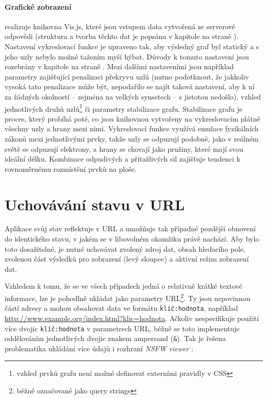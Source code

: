 \documentclass[a4paper, 11pt, oneside]{book}
\newcommand{\simplywn}{\textit{NSFW viewer} }
\newcommand{\itNameRef}[1]{\textit{\nameref{#1}}}
\begin{document}
				\paragraph{Grafické zobrazení} realizuje knihovna Vis.js, které jsou vstupem data vytvořená ze serverové odpovědi (struktura a tvorba těchto dat je popsána v kapitole \itNameRef{cha:zpracovani} na straně \pageref{cha:zpracovani}). Nastavení vykreslovací funkce je upraveno tak, aby výsledný graf byl statický a s jeho uzly nebylo možné tažením myší hýbat. Důvody k tomuto nastavení jsou rozebrány v kapitole \itNameRef{cha:navrh} na straně \pageref{cha:shrnuti-prehledu}. Mezi dalšími nastaveními jsou například parametry zajišťující penalizaci překryvu uzlů (nutno podotknout, že jakkoliv vysoká tato penalizace může být, nepodařilo se najít taková nastavení, aby k ní za žádných okolností -- zejména na velkých synsetech -- s jistotou nedošlo), vzhled jednotlivých druhů uzlů\footnote{vzhled prvků grafu není možné definovat externími pravidly v CSS} či parametry stabilizace grafu. Stabilizace grafu je proces, který probíhá poté, co jsou knihovnou vytvořeny na vykreslovacím plátně všechny uzly a hrany mezi nimi. Vykreslovací funkce využívá emulace fyzikálních zákonů mezi jednotlivými prvky, takže uzly se odpuzují podobně, jako v reálném světě se odpuzují elektrony, a hrany se chovají jako pružiny, které mají svou ideální délku. Kombinace odpudivých a přitažlivých sil zajišťuje tendenci k rovnoměrnému rozmístění prvků na ploše.

			\section{Uchovávání stavu v URL}

				Aplikace svůj stav reflektuje v URL a umožňuje tak případné pozdější obnovení do identického stavu, v jakém se v libovolném okamžiku právě nachází. Aby bylo toto dosažitelné, je nutné uchovávat zvolený zdroj dat, obsah hledacího pole, zvolenou část výsledků pro zobrazení (levý sloupec) a aktivní režim zobrazení dat. 

				Vzhledem k tomu, že se ve všech případech jedná o relativně krátké textové informace, lze je pohodlně ukládat jako parametry URL\footnote{běžně označované jako query strings}. Ty jsou nepovinnou částí adresy a mohou obsahovat data ve formátu \texttt{klíč:hodnota}, například \url{http://www.example.org/index.html?klic=hodnota}. \parencite{berners2005uniform} Ačkoliv \textcite{berners2005uniform} nespecifikuje použití více dvojic \texttt{klíč:hodnota} v parametrech URL, běžně se toto implementuje oddělováním jednotlivých dvojic znakem ampersand (\texttt{\&}). Tak je řešena problematika ukládání více údajů i rozhraní \simplywn: 
\end{document}
